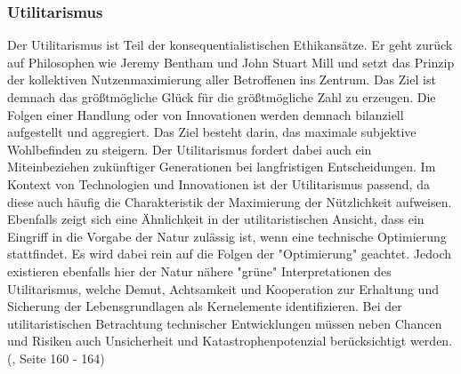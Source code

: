 \subsubsection{Utilitarismus}
Der Utilitarismus ist Teil der konsequentialistischen Ethikansätze. Er geht zurück auf Philosophen wie Jeremy Bentham und John Stuart Mill und setzt das Prinzip der kollektiven Nutzenmaximierung aller Betroffenen ins Zentrum. Das Ziel ist demnach das größtmögliche Glück für die größtmögliche Zahl zu erzeugen. Die Folgen einer Handlung oder von Innovationen werden demnach bilanziell aufgestellt und aggregiert. Das Ziel besteht darin, das maximale subjektive Wohlbefinden zu steigern. Der Utilitarismus fordert dabei auch ein Miteinbeziehen zukünftiger Generationen bei langfristigen Entscheidungen. Im Kontext von Technologien und Innovationen ist der Utilitarismus passend, da diese auch häufig die Charakteristik der Maximierung der Nützlichkeit aufweisen. Ebenfalls zeigt sich eine Ähnlichkeit in der utilitaristischen Ansicht, dass ein Eingriff in die Vorgabe der Natur zulässig ist, wenn eine technische Optimierung stattfindet. Es wird dabei rein auf die Folgen der "Optimierung" geachtet.  Jedoch existieren ebenfalls hier der Natur nähere "grüne"  Interpretationen des Utilitarismus, welche Demut, Achtsamkeit und Kooperation zur Erhaltung und Sicherung der Lebensgrundlagen als Kernelemente identifizieren. Bei der utilitaristischen Betrachtung technischer Entwicklungen müssen neben Chancen und Risiken auch Unsicherheit und Katastrophenpotenzial berücksichtigt werden. (\cite{grunwaldHandbuchTechnikethik2021}, Seite 160 - 164)

